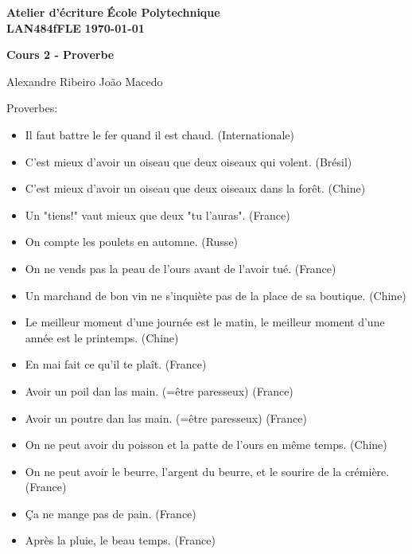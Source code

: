 \documentclass[10pt]{article} %
\newcommand{\createHeader}[5]{
	\noindent
	\normalsize\textbf{#2} \hfill \textbf{#1}\\
	\normalsize\textbf{#3} \hfill \textbf{\today}\vspace{20pt}
	\centerline{\Large \textbf{#5}}\vspace{3pt}
	\centerline{\normalsize #4}\vspace{20pt}}
\begin{document}
	\createHeader{École Polytechnique}{Atelier d'écriture}{LAN484fFLE}{Alexandre Ribeiro João Macedo}{Cours 2 - Proverbe}
	Proverbes:
	\begin{itemize}
		\item Il faut battre le fer quand il est chaud. (Internationale)
		\\
		\item C'est mieux d'avoir un oiseau que deux oiseaux qui volent. (Brésil)
		\item C'est mieux d'avoir un oiseau que deux oiseaux dans la forêt. (Chine)
		\item Un "tiens!" vaut mieux que deux "tu l'auras". (France)
		\\
		\item On compte les poulets en automne. (Russe)
		\item On ne vends pas la peau de l'ours avant de l'avoir tué. (France)
		\\
		\item Un marchand de bon vin ne s'inquiète pas de la place de sa boutique. (Chine)
		\\
		\item Le meilleur moment d'une journée est le matin, le meilleur moment d'une année est le printemps. (Chine)
		\item En mai fait ce qu'il te plaît. (France)
		\\
		\item Avoir un poil dan las main. (=être paresseux) (France)
		\item Avoir un poutre dan las main. (=être paresseux) (France)
		\\
		\item On ne peut avoir du poisson et la patte de l'ours en même temps. (Chine)
		\item On ne peut avoir le beurre, l'argent du beurre, et le sourire de la crémière. (France) 
		\\
		\item Ça ne mange pas de pain. (France)
		\\
		\item Après la pluie, le beau temps. (France)
		
	\end{itemize}
	
\end{document}
